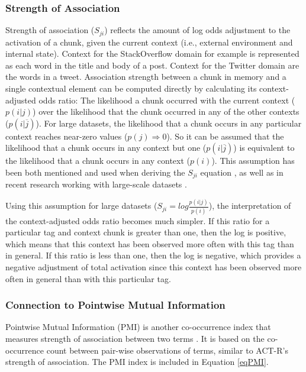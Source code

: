 \documentclass[man,floatsintext,donotrepeattitle]{apa6}
\begin{document}
\subsubsection{Strength of Association}

Strength of association ($S_{ji}$) reflects the amount of log odds adjustment to the activation of a chunk, given the current context (i.e., external environment and internal state).
Context for the StackOverflow domain for example is represented as each word in the title and body of a post.
Context for the Twitter domain are the words in a tweet.
Association strength between a chunk in memory and a single contextual element can be computed directly by calculating its context-adjusted odds ratio:
The likelihood a chunk occurred with the current context ($p(i|j)$) over the likelihood that the chunk occurred in any of the other contexts ($p(i|\overline{j})$).
For large datasets, the likelihood that a chunk occurs in any particular context reaches near-zero values ($p(j) \Rightarrow 0$).
So it can be assumed that the likelihood that a chunk occurs in any context but one ($p(i|\overline{j})$) is equivalent to the likelihood that a chunk occurs in any context ($p(i)$).
This assumption has been both mentioned and used when deriving the $S_{ji}$ equation \parencite{Anderson1989}, as well as in recent research working with large-scale datasets \parencite{Stanley2013}.

Using this assumption for large datasets ($S_{ji} = log \frac{p(i|j)}{p(i)}$), the interpretation of the context-adjusted odds ratio becomes much simpler.
If this ratio for a particular tag and context chunk is greater than one, then the log is positive, which means that this context has been observed more often with this tag than in general.
If this ratio is less than one, then the log is negative, which provides a negative adjustment of total activation since this context has been observed more often in general than with this particular tag.

\subsubsection{Connection to Pointwise Mutual Information}

Pointwise Mutual Information (PMI) is another co-occurrence index that measures strength of association between two terms \parencite{Farahat2004}.
It is based on the co-occurrence count between pair-wise observations of terms, similar to ACT-R's strength of association.
The PMI index is included in Equation \eqref{eqPMI}.
\end{document}
